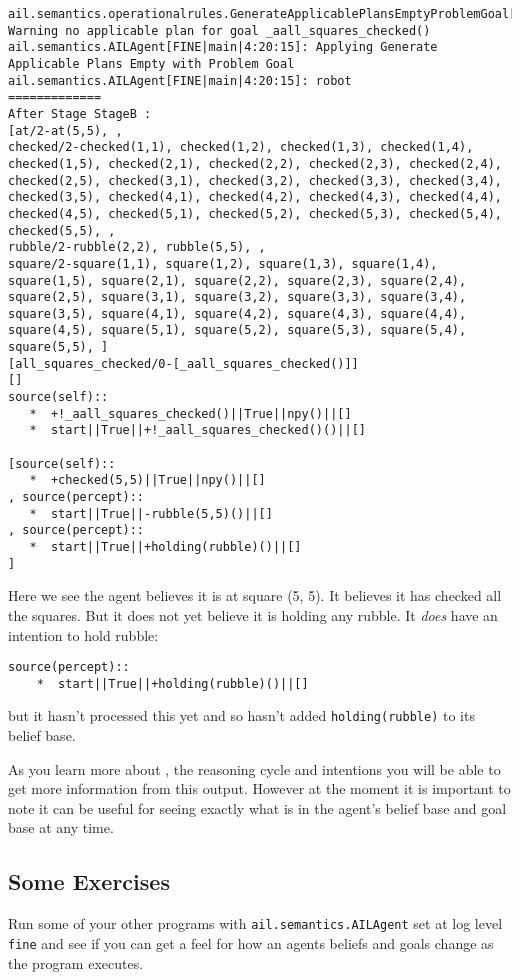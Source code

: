 \begin{verbatim}
ail.semantics.operationalrules.GenerateApplicablePlansEmptyProblemGoal[WARNING|main|4:20:15]: Warning no applicable plan for goal _aall_squares_checked() 
ail.semantics.AILAgent[FINE|main|4:20:15]: Applying Generate Applicable Plans Empty with Problem Goal 
ail.semantics.AILAgent[FINE|main|4:20:15]: robot
=============
After Stage StageB :
[at/2-at(5,5), , 
checked/2-checked(1,1), checked(1,2), checked(1,3), checked(1,4), checked(1,5), checked(2,1), checked(2,2), checked(2,3), checked(2,4), checked(2,5), checked(3,1), checked(3,2), checked(3,3), checked(3,4), checked(3,5), checked(4,1), checked(4,2), checked(4,3), checked(4,4), checked(4,5), checked(5,1), checked(5,2), checked(5,3), checked(5,4), checked(5,5), , 
rubble/2-rubble(2,2), rubble(5,5), , 
square/2-square(1,1), square(1,2), square(1,3), square(1,4), square(1,5), square(2,1), square(2,2), square(2,3), square(2,4), square(2,5), square(3,1), square(3,2), square(3,3), square(3,4), square(3,5), square(4,1), square(4,2), square(4,3), square(4,4), square(4,5), square(5,1), square(5,2), square(5,3), square(5,4), square(5,5), ]
[all_squares_checked/0-[_aall_squares_checked()]]
[]
source(self):: 
   *  +!_aall_squares_checked()||True||npy()||[]
   *  start||True||+!_aall_squares_checked()()||[]

[source(self):: 
   *  +checked(5,5)||True||npy()||[]
, source(percept):: 
   *  start||True||-rubble(5,5)()||[]
, source(percept):: 
   *  start||True||+holding(rubble)()||[]
] 
\end{verbatim}
Here we see the agent believes it is at square (5, 5).  It believes it has checked all the squares.  But it does not yet believe it is holding any rubble.  It \emph{does} have an intention to hold rubble:
\begin{verbatim}
source(percept):: 
    *  start||True||+holding(rubble)()||[]
\end{verbatim}
but it hasn't processed this yet and so hasn't added \texttt{holding(rubble)} to its belief base.

As you learn more about \gwendolen, the reasoning cycle and intentions you will be able to get more information from this output.  However at the moment it is important to note it can be useful for seeing exactly what is in the agent's belief base and goal base at any time.

\subsection{Some Exercises}
Run some of your other programs with \texttt{ail.semantics.AILAgent} set at log level \texttt{fine} and see if you can get a feel for how an agents beliefs and goals change as the program executes.

